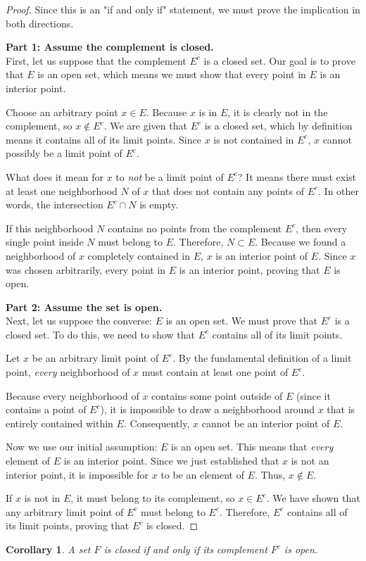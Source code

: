 \documentclass{article}
\theoremstyle{mythm}
\newtheorem{corollary}{Corollary}[theorem]
\begin{document}
\begin{proof}
Since this is an "if and only if" statement, we must prove the implication in both directions.

\textbf{Part 1: Assume the complement is closed.} \\
First, let us suppose that the complement $E^c$ is a closed set. Our goal is to prove that $E$ is an open set, which means we must show that every point in $E$ is an interior point.

Choose an arbitrary point $x \in E$. Because $x$ is in $E$, it is clearly not in the complement, so $x \notin E^c$. We are given that $E^c$ is a closed set, which by definition means it contains all of its limit points. Since $x$ is not contained in $E^c$, $x$ cannot possibly be a limit point of $E^c$.

What does it mean for $x$ to \textit{not} be a limit point of $E^c$? It means there must exist at least one neighborhood $N$ of $x$ that does not contain any points of $E^c$. In other words, the intersection $E^c \cap N$ is empty. 

If this neighborhood $N$ contains no points from the complement $E^c$, then every single point inside $N$ must belong to $E$. Therefore, $N \subset E$. Because we found a neighborhood of $x$ completely contained in $E$, $x$ is an interior point of $E$. Since $x$ was chosen arbitrarily, every point in $E$ is an interior point, proving that $E$ is open.

\textbf{Part 2: Assume the set is open.} \\
Next, let us suppose the converse: $E$ is an open set. We must prove that $E^c$ is a closed set. To do this, we need to show that $E^c$ contains all of its limit points.

Let $x$ be an arbitrary limit point of $E^c$. By the fundamental definition of a limit point, \textit{every} neighborhood of $x$ must contain at least one point of $E^c$. 

Because every neighborhood of $x$ contains some point outside of $E$ (since it contains a point of $E^c$), it is impossible to draw a neighborhood around $x$ that is entirely contained within $E$. Consequently, $x$ cannot be an interior point of $E$.

Now we use our initial assumption: $E$ is an open set. This means that \textit{every} element of $E$ is an interior point. Since we just established that $x$ is not an interior point, it is impossible for $x$ to be an element of $E$. Thus, $x \notin E$.

If $x$ is not in $E$, it must belong to its complement, so $x \in E^c$. We have shown that any arbitrary limit point of $E^c$ must belong to $E^c$. Therefore, $E^c$ contains all of its limit points, proving that $E^c$ is closed.
\end{proof}
\begin{corollary}
A set $F$ is closed if and only if its complement $F^c$ is open.
\end{corollary}
\end{document}
